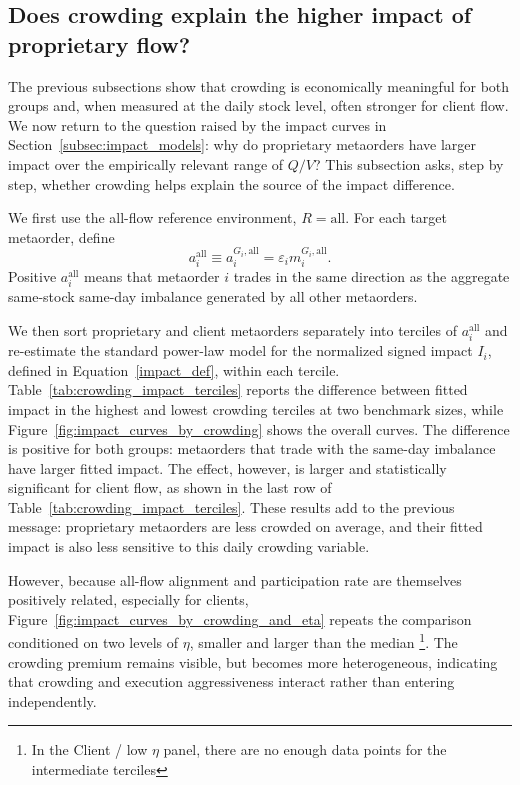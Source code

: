 \documentclass[11pt]{article}
\begin{document}
\subsection{Does crowding explain the higher impact of proprietary flow?}
\label{subsec:crowding_impact}

The previous subsections show that crowding is economically meaningful for both
groups and, when measured at the daily stock level, often stronger for client
flow. We now return to the question raised by the impact curves in
Section~\ref{subsec:impact_models}: why do proprietary metaorders have larger
impact over the empirically relevant range of \(Q/V\)? This subsection asks,
step by step, whether crowding helps explain the source of the impact
difference.

We first use the all-flow reference environment, \(R=\mathrm{all}\). For each
target metaorder, define
\begin{equation}
  a_i^{\mathrm{all}} \equiv a_i^{G_i,\mathrm{all}}
  = \varepsilon_i m_i^{G_i,\mathrm{all}}.
\end{equation}
Positive \(a_i^{\mathrm{all}}\) means that metaorder \(i\) trades in the same
direction as the aggregate same-stock same-day imbalance generated by all other
metaorders.

We then sort proprietary and client metaorders separately into terciles of
\(a_i^{\mathrm{all}}\) and re-estimate the standard power-law model for the
normalized signed impact \(I_i\), defined in Equation~\eqref{impact_def}, within
each tercile. Table~\ref{tab:crowding_impact_terciles} reports the difference
between fitted impact in the highest and lowest crowding terciles at two
benchmark sizes, while Figure~\ref{fig:impact_curves_by_crowding} shows the
overall curves. The difference is positive for both groups: metaorders that
trade with the same-day imbalance have larger fitted impact. The effect,
however, is larger and statistically significant for client flow, as shown in
the last row of Table~\ref{tab:crowding_impact_terciles}. These results add to
the previous message: proprietary metaorders are less crowded on average, and
their fitted impact is also less sensitive to this daily crowding variable.

However, because all-flow alignment and participation rate are themselves
positively related, especially for clients, Figure~\ref{fig:impact_curves_by_crowding_and_eta}
repeats the comparison conditioned on two levels of \(\eta\), smaller and larger
than the median \footnote{In the Client / low $\eta$ panel, there are no 
enough data points for the intermediate terciles}. The crowding premium remains visible, but becomes more
heterogeneous, indicating that crowding and execution aggressiveness interact
rather than entering independently.
\end{document}
